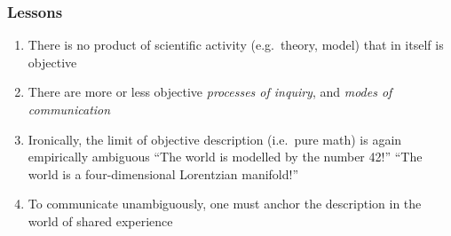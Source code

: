 \documentclass{beamer}
\begin{document}
\begin{frame}
  \frametitle{Lessons}
  \begin{enumerate}
  \item There is no product of scientific activity (e.g.\ theory,
    model) that in itself is objective
  \item There are more or less objective {\it processes of inquiry},
    and {\it modes of communication}
  \item Ironically, the limit of objective description (i.e.\ pure
    math) is again empirically ambiguous \newline ``The world is
    modelled by the number 42!''  \newline ``The world is a four-dimensional
    Lorentzian manifold!''
  \item To communicate unambiguously, one must anchor the description
    in the world of shared experience
  \end{enumerate}
  \end{frame}
\end{document}
